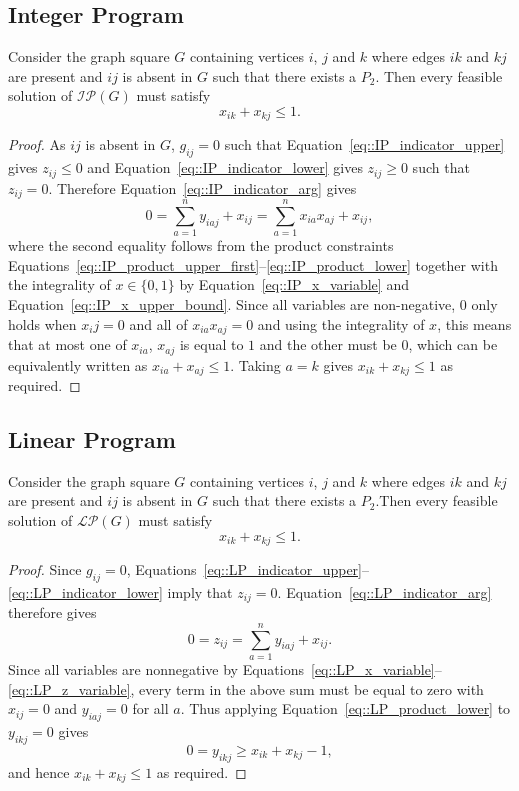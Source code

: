 
\subsection{Integer Program} \label{subsec::two_edge_path_integer_program}

\begin{lemma} \label{lemma::two_edges_integer_sum}
  Consider the graph square $G$ containing vertices $i$, $j$ and $k$ where edges $ik$ and $kj$ are present and $ij$ is absent in $G$ such that there exists a $P_2$. Then every feasible solution of $\mathcal{IP}(G)$ must satisfy
  \[
  x_{ik} + x_{kj} \leq 1. 
  \]
\end{lemma}
\begin{proof}
  As $ij$ is absent in $G$, $g_{ij} = 0$ such that Equation~\eqref{eq::IP_indicator_upper} gives $z_{ij} \leq 0$ and Equation~\eqref{eq::IP_indicator_lower} gives $z_{ij} \geq 0$ such that $z_{ij} = 0$. Therefore Equation~\eqref{eq::IP_indicator_arg} gives 
  \[
  0 = \sum_{a=1}^{n}y_{iaj}+x_{ij} = \sum_{a=1}^{n}x_{ia}x_{aj}+x_{ij},
  \]
  where the second equality follows from the product constraints Equations~\eqref{eq::IP_product_upper_first}--\eqref{eq::IP_product_lower} together with the integrality of $x \in \{0, 1\}$ by Equation~\eqref{eq::IP_x_variable} and Equation~\eqref{eq::IP_x_upper_bound}. Since all variables are non-negative, $0$ only holds when $x_ij = 0$ and all of $x_{ia} x_{aj}=0$ and using the integrality of $x$, this means that at most one of $x_{ia}$, $x_{aj}$ is equal to $1$ and the other must be $0$, which can be equivalently written as $x_{ia} + x_{aj} \leq 1$. Taking $a=k$ gives $x_{ik}+x_{kj} \leq 1$ as required. 
\end{proof}

\subsection{Linear Program} \label{subsec::two_edge_path_linear_program}

\begin{lemma} \label{lemma::two_edges_linear_sum}
  Consider the graph square $G$ containing vertices $i$, $j$ and $k$ where edges $ik$ and $kj$ are present and $ij$ is absent in $G$ such that there exists a $P_2$.Then every feasible solution of $\mathcal{LP}(G)$ must satisfy 
  \[
  x_{ik} + x_{kj} \leq 1. 
  \]
\end{lemma}
\begin{proof}
  Since $g_{ij}=0$, Equations~\eqref{eq::LP_indicator_upper}--\eqref{eq::LP_indicator_lower} imply that $z_{ij}=0$.
  Equation~\eqref{eq::LP_indicator_arg} therefore gives
  \[
  0 = z_{ij} = \sum_{a=1}^{n} y_{iaj} + x_{ij}.
  \]
  Since all variables are nonnegative by Equations~\eqref{eq::LP_x_variable}--\eqref{eq::LP_z_variable}, every term in the above sum must be equal to zero with $x_{ij} = 0$ and $y_{iaj} = 0$ for all $a$. Thus applying Equation~\eqref{eq::LP_product_lower} to $y_{ikj} = 0$ gives
  \[
  0 = y_{ikj} \geq x_{ik} + x_{kj} - 1,
  \]
  and hence $x_{ik}+x_{kj} \leq 1$ as required.
\end{proof}


